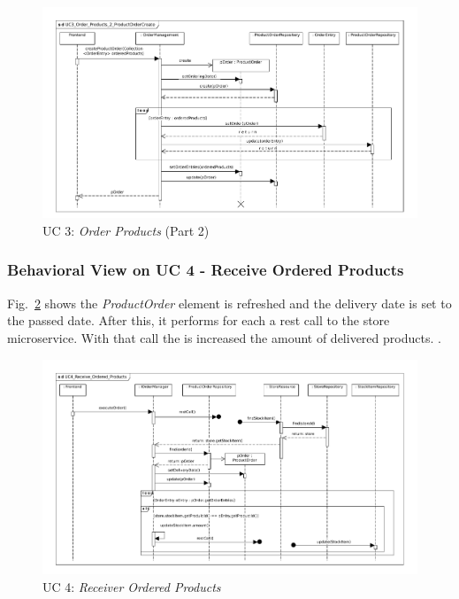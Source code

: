 			\begin{figure}[!h]
				\centering
				\includegraphics[width = 1\textwidth]{img/UC3_Order_Products_2_ProductOrderCreate.pdf}
				\caption{UC 3: \textit{Order Products} (Part 2)}
				\label{MS_UC3_2}
			\end{figure}
		
		\subsubsection*{Behavioral View on UC 4 - Receive Ordered Products}
		Fig.~\ref{MS_UC4} shows the \textit{ProductOrder} element
		 is refreshed and the delivery date is set to the passed date.
		After this, it performs for each  a rest call to the store microservice. With that  call the  is increased the amount of delivered products.
		.
			
			\begin{figure}[!h]
				\centering
				\includegraphics[width = 1\textwidth]{img/UC4_Receive_Ordered_Products.pdf}
				\caption{UC 4: \textit{Receiver Ordered Products} }
				\label{MS_UC4}
			\end{figure}
			
